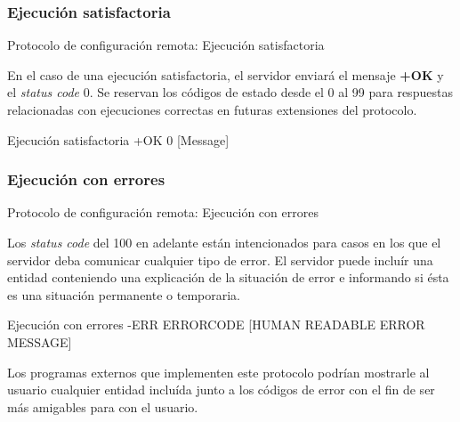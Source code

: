 \documentclass{beamer}
\begin{document}
\subsubsection{Ejecución satisfactoria}

\begin{frame}{Protocolo de configuración remota: Ejecución satisfactoria}

\par En el caso de una ejecución satisfactoria, el servidor enviará el mensaje \textbf{+OK} y el \textit{status code} 0. Se reservan los códigos de estado desde el 0 al 99 para respuestas relacionadas con ejecuciones correctas en futuras extensiones del protocolo.

\begin{block}{Ejecución satisfactoria}
+OK 0 [Message]
\end{block}

\end{frame}

\subsubsection{Ejecución con errores}

\begin{frame}{Protocolo de configuración remota: Ejecución con errores}

\par Los \textit{status code} del 100 en adelante están intencionados para casos en los que el servidor deba comunicar cualquier tipo de error. El servidor puede incluír una entidad conteniendo una explicación de la situación de error e informando si ésta es una situación permanente o temporaria.\\

\begin{alertblock}{Ejecución con errores}
-ERR ERROR\textunderscore CODE [HUMAN READABLE ERROR MESSAGE]
\end{alertblock}


\par Los programas externos que implementen este protocolo podrían mostrarle al usuario cualquier entidad incluída junto a los códigos de error con el fin de ser más amigables para con el usuario.\\

\end{frame}
\end{document}
